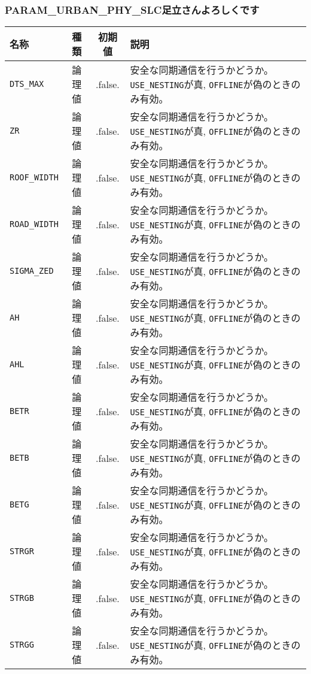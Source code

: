 \subsubsection{PARAM\_URBAN\_PHY\_SLC足立さんよろしくです}
\begin{tabularx}{150mm}{|l|c|c|X|} \hline
 \rowcolor[gray]{0.9} 名称 & 種類 & 初期値 & 説明 \\ \hline
 \verb|DTS_MAX| & 論理値 & .false. & 安全な同期通信を行うかどうか。\verb|USE_NESTING|が真, \verb|OFFLINE|が偽のときのみ有効。 \\ \hline
 \verb|ZR| & 論理値 & .false. & 安全な同期通信を行うかどうか。\verb|USE_NESTING|が真, \verb|OFFLINE|が偽のときのみ有効。 \\ \hline
 \verb|ROOF_WIDTH| & 論理値 & .false. & 安全な同期通信を行うかどうか。\verb|USE_NESTING|が真, \verb|OFFLINE|が偽のときのみ有効。 \\ \hline
 \verb|ROAD_WIDTH| & 論理値 & .false. & 安全な同期通信を行うかどうか。\verb|USE_NESTING|が真, \verb|OFFLINE|が偽のときのみ有効。 \\ \hline
 \verb|SIGMA_ZED| & 論理値 & .false. & 安全な同期通信を行うかどうか。\verb|USE_NESTING|が真, \verb|OFFLINE|が偽のときのみ有効。 \\ \hline
 \verb|AH| & 論理値 & .false. & 安全な同期通信を行うかどうか。\verb|USE_NESTING|が真, \verb|OFFLINE|が偽のときのみ有効。 \\ \hline
 \verb|AHL| & 論理値 & .false. & 安全な同期通信を行うかどうか。\verb|USE_NESTING|が真, \verb|OFFLINE|が偽のときのみ有効。 \\ \hline
 \verb|BETR| & 論理値 & .false. & 安全な同期通信を行うかどうか。\verb|USE_NESTING|が真, \verb|OFFLINE|が偽のときのみ有効。 \\ \hline
 \verb|BETB| & 論理値 & .false. & 安全な同期通信を行うかどうか。\verb|USE_NESTING|が真, \verb|OFFLINE|が偽のときのみ有効。 \\ \hline
 \verb|BETG| & 論理値 & .false. & 安全な同期通信を行うかどうか。\verb|USE_NESTING|が真, \verb|OFFLINE|が偽のときのみ有効。 \\ \hline
 \verb|STRGR| & 論理値 & .false. & 安全な同期通信を行うかどうか。\verb|USE_NESTING|が真, \verb|OFFLINE|が偽のときのみ有効。 \\ \hline
 \verb|STRGB| & 論理値 & .false. & 安全な同期通信を行うかどうか。\verb|USE_NESTING|が真, \verb|OFFLINE|が偽のときのみ有効。 \\ \hline
 \verb|STRGG| & 論理値 & .false. & 安全な同期通信を行うかどうか。\verb|USE_NESTING|が真, \verb|OFFLINE|が偽のときのみ有効。 \\ \hline

\end{tabularx}

